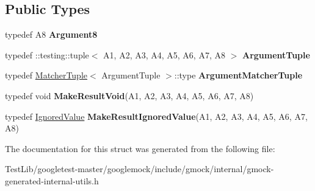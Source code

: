 \subsection*{Public Types}
\begin{DoxyCompactItemize}
\item 
\mbox{\label{structtesting_1_1internal_1_1Function_3_01R_07A1_00_01A2_00_01A3_00_01A4_00_01A5_00_01A6_00_01A7_00_01A8_08_4_a040234496283b1d0f5f508ac770107f6}} 
typedef A8 {\bfseries Argument8}
\item 
\mbox{\label{structtesting_1_1internal_1_1Function_3_01R_07A1_00_01A2_00_01A3_00_01A4_00_01A5_00_01A6_00_01A7_00_01A8_08_4_a51df8fdb5ce9de7de4d5f86ba5708a9e}} 
typedef \+::testing\+::tuple$<$ A1, A2, A3, A4, A5, A6, A7, A8 $>$ {\bfseries Argument\+Tuple}
\item 
\mbox{\label{structtesting_1_1internal_1_1Function_3_01R_07A1_00_01A2_00_01A3_00_01A4_00_01A5_00_01A6_00_01A7_00_01A8_08_4_a17a23c6751d1493e1069d535e28bcab2}} 
typedef \hyperlink{structtesting_1_1internal_1_1MatcherTuple}{Matcher\+Tuple}$<$ Argument\+Tuple $>$\+::type {\bfseries Argument\+Matcher\+Tuple}
\item 
\mbox{\label{structtesting_1_1internal_1_1Function_3_01R_07A1_00_01A2_00_01A3_00_01A4_00_01A5_00_01A6_00_01A7_00_01A8_08_4_a421404d7553350ee8a1890a21d9fbc55}} 
typedef void {\bfseries Make\+Result\+Void}(A1, A2, A3, A4, A5, A6, A7, A8)
\item 
\mbox{\label{structtesting_1_1internal_1_1Function_3_01R_07A1_00_01A2_00_01A3_00_01A4_00_01A5_00_01A6_00_01A7_00_01A8_08_4_a845b40c19850bfb84cdd778e2fb51b3d}} 
typedef \hyperlink{classtesting_1_1internal_1_1IgnoredValue}{Ignored\+Value} {\bfseries Make\+Result\+Ignored\+Value}(A1, A2, A3, A4, A5, A6, A7, A8)
\end{DoxyCompactItemize}


The documentation for this struct was generated from the following file\+:\begin{DoxyCompactItemize}
\item 
Test\+Lib/googletest-\/master/googlemock/include/gmock/internal/gmock-\/generated-\/internal-\/utils.\+h\end{DoxyCompactItemize}
